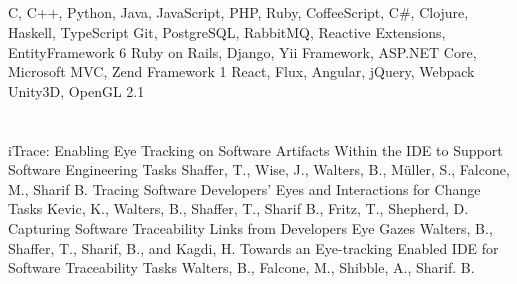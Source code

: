\documentclass[8pt,a4paper]{moderncv}
\begin{document}
  \subsection{}
          {C, C++, Python, Java, JavaScript, PHP, Ruby, CoffeeScript, C\#,
           \linebreak Clojure, Haskell, TypeScript}{}{}{}{}
          {\ignorespaces
           }{}{}{}{}
          {\ignorespaces
           }{}{}{}{}
          {Git, PostgreSQL, RabbitMQ, Reactive Extensions, EntityFramework 6}
          {}{}{}{}
          {Ruby on Rails, Django, Yii Framework, ASP.NET Core, Microsoft MVC, Zend Framework 1}
          {}{}{}{}
           {React, Flux, Angular, jQuery, Webpack}{}{}{}{}
          {\ignorespaces
           }{}{}{}{}
          {Unity3D, OpenGL 2.1}{}{}{}{}

  \section{\textbf{\ignorespaces
                   }}
  \subsection{}
          {iTrace: Enabling Eye Tracking on Software Artifacts Within the IDE to Support Software Engineering Tasks}
          {Shaffer, T., Wise, J., Walters, B., M\"uller, S., Falcone, M., Sharif B.}
          {}{}{}
          {Tracing Software Developers’ Eyes and Interactions for Change Tasks}
          {Kevic, K., Walters, B., Shaffer, T., Sharif B., Fritz, T., Shepherd, D.}
          {}{}{}
          {Capturing Software Traceability Links from Developers Eye Gazes}
          {Walters, B., Shaffer, T., Sharif, B., and Kagdi, H.}
          {}{}{}
          {Towards an Eye-tracking Enabled IDE for Software Traceability Tasks}
          {Walters, B., Falcone, M., Shibble, A., Sharif. B.}
          {}{}{}
  \vspace{1mm}
\end{document}
